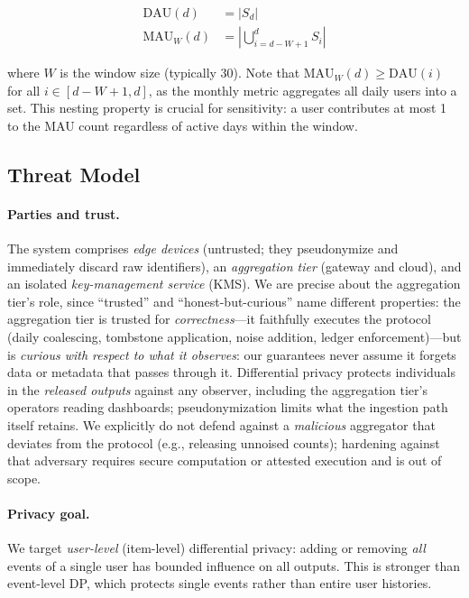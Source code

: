 \documentclass[sigconf,anonymous,review]{acmart}
\begin{document}
\begin{align}
    \text{DAU}(d)   & = |S_d|                                    \\
    \text{MAU}_W(d) & = \left| \bigcup_{i=d-W+1}^{d} S_i \right|
\end{align}

where $W$ is the window size (typically 30). Note that $\text{MAU}_W(d) \geq \text{DAU}(i)$ for all $i \in [d-W+1, d]$, as the monthly metric aggregates all daily users into a set. This nesting property is crucial for sensitivity: a user contributes at most 1 to the MAU count regardless of active days within the window.

\subsection{Threat Model}
\label{sec:threat-model}

\paragraph{Parties and trust.} The system comprises \emph{edge devices} (untrusted; they pseudonymize and immediately discard raw identifiers), an \emph{aggregation tier} (gateway and cloud), and an isolated \emph{key-management service} (KMS). We are precise about the aggregation tier's role, since ``trusted'' and ``honest-but-curious'' name different properties: the aggregation tier is trusted for \emph{correctness}---it faithfully executes the protocol (daily coalescing, tombstone application, noise addition, ledger enforcement)---but is \emph{curious with respect to what it observes}: our guarantees never assume it forgets data or metadata that passes through it. Differential privacy protects individuals in the \emph{released outputs} against any observer, including the aggregation tier's operators reading dashboards; pseudonymization limits what the ingestion path itself retains. We explicitly do not defend against a \emph{malicious} aggregator that deviates from the protocol (e.g., releasing unnoised counts); hardening against that adversary requires secure computation or attested execution and is out of scope.

\paragraph{Privacy goal.} We target \emph{user-level} (item-level) differential privacy: adding or removing \emph{all} events of a single user has bounded influence on all outputs. This is stronger than event-level DP, which protects single events rather than entire user histories.
\end{document}
